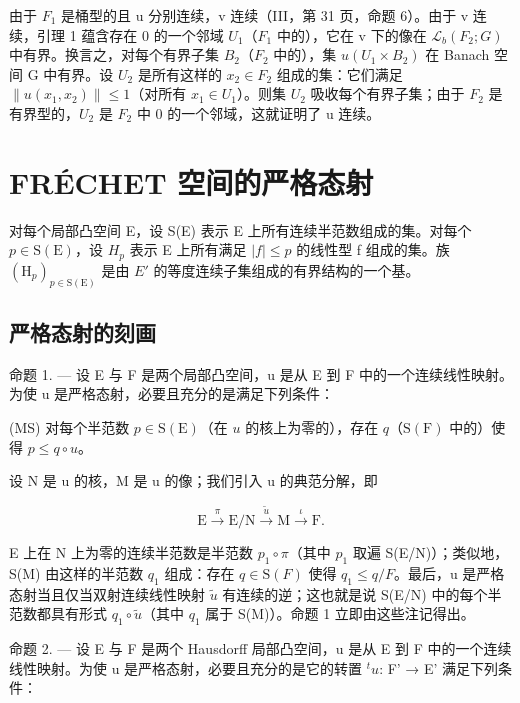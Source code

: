 由于 \(F_{1}\) 是桶型的且 u 分别连续，v 连续（III，第 31 页，命题 6）。由于 v 连续，引理 1 蕴含存在 0 的一个邻域 \(U_{1}\)（\(F_{1}\) 中的），它在 v 下的像在 \(\mathcal{L}_{b}(F_{2}; G)\) 中有界。换言之，对每个有界子集 \(B_{2}\)（\(F_{2}\) 中的），集 \(u(U_{1} \times B_{2})\) 在 Banach 空间 G 中有界。设 \(U_{2}\) 是所有这样的 \(x_{2} \in F_{2}\) 组成的集：它们满足 \(\|u(x_{1}, x_{2})\| \leqslant 1\)（对所有 \(x_{1} \in U_{1}\)）。则集 \(U_{2}\) 吸收每个有界子集；由于 \(F_{2}\) 是有界型的，\(U_{2}\) 是 \(F_{2}\) 中 0 的一个邻域，这就证明了 u 连续。

\section{FRÉCHET 空间的严格态射}

对每个局部凸空间 E，设 S(E) 表示 E 上所有连续半范数组成的集。对每个 \(p \in \mathrm{S}(\mathrm{E})\)，设 \(H_{p}\) 表示 E 上所有满足 \(|f| \leqslant p\) 的线性型 f 组成的集。族 \((\mathrm{H}_{p})_{p \in \mathrm{S}(\mathrm{E})}\) 是由 \(E'\) 的等度连续子集组成的有界结构的一个基。

\subsection{严格态射的刻画}

命题 1. --- 设 E 与 F 是两个局部凸空间，u 是从 E 到 F 中的一个连续线性映射。为使 u 是严格态射，必要且充分的是满足下列条件：

(MS) 对每个半范数 \(p \in \mathrm{S}(\mathrm{E})\)（在 \(u\) 的核上为零的），存在 \(q\)（\(\mathrm{S}(\mathrm{F})\) 中的）使得 \(p \leqslant q \circ u\)。

设 N 是 u 的核，M 是 u 的像；我们引入 u 的典范分解，即

\[
\mathrm{E} \xrightarrow {\pi} \mathrm{E} / \mathrm{N} \xrightarrow {\tilde {u}} \mathrm{M} \xrightarrow {\iota} \mathrm{F}.
\]

E 上在 N 上为零的连续半范数是半范数 \(p_{1} \circ \pi\)（其中 \(p_{1}\) 取遍 S(E/N)）；类似地，S(M) 由这样的半范数 \(q_{1}\) 组成：存在 \(q \in \mathrm{S}(F)\) 使得 \(q_{1} \leqslant q/F\)。最后，u 是严格态射当且仅当双射连续线性映射 \(\tilde{u}\) 有连续的逆；这也就是说 S(E/N) 中的每个半范数都具有形式 \(q_{1} \circ \tilde{u}\)（其中 \(q_{1}\) 属于 S(M)）。命题 1 立即由这些注记得出。

命题 2. --- 设 E 与 F 是两个 Hausdorff 局部凸空间，u 是从 E 到 F 中的一个连续线性映射。为使 u 是严格态射，必要且充分的是它的转置 \({}^t u\): F' → E' 满足下列条件：

